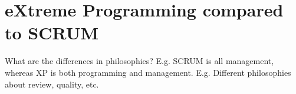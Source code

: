\section{eXtreme Programming compared to SCRUM}
What are the differences in philosophies?
E.g. SCRUM is all management, whereas XP is both programming and management.
E.g. Different philosophies about review, quality, etc.